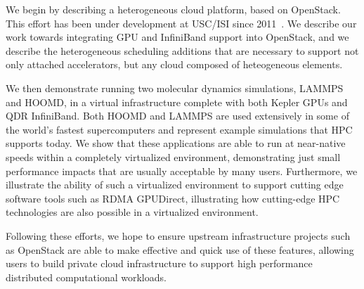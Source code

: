 \documentclass{sigplanconf}
\begin{document}
We begin by describing a heterogeneous cloud platform, based on OpenStack. This
effort has been under development at USC/ISI since 2011~\cite{crago2011heterogeneous}.
We describe our work towards integrating GPU and InfiniBand support into
OpenStack, and we describe the heterogeneous scheduling additions that are
necessary to support not only attached accelerators, but any cloud composed of
heteogeneous elements.  

We then demonstrate running two molecular dynamics simulations, LAMMPS and HOOMD, in a virtual infrastructure complete with both Kepler GPUs and QDR InfiniBand.  Both HOOMD and LAMMPS are used extensively in some of the world's fastest supercomputers and represent example simulations that HPC supports today.  We show that these applications are able to run at near-native speeds within a completely virtualized environment, demonstrating just small performance impacts that are usually acceptable by many users. Furthermore, we illustrate the ability of such a virtualized environment to support cutting edge software tools such as RDMA GPUDirect, illustrating how cutting-edge HPC technologies are also possible in a virtualized environment. 

Following these efforts, we hope to ensure upstream infrastructure projects such as OpenStack \cite{www-openstack, pepple2011deploying} are able to make effective and quick use of these features, allowing users to build private cloud infrastructure to support high performance distributed computational workloads. 





 

\end{document}
